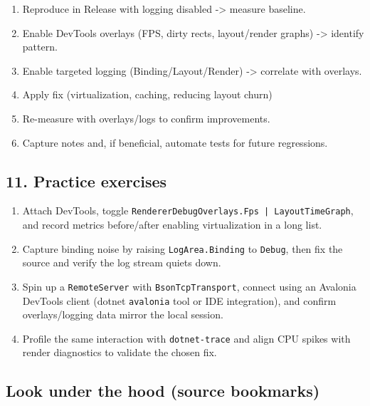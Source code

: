 \begin{enumerate}
\def\labelenumi{\arabic{enumi}.}
\tightlist
\item
  Reproduce in Release with logging disabled -\textgreater{} measure
  baseline.
\item
  Enable DevTools overlays (FPS, dirty rects, layout/render graphs)
  -\textgreater{} identify pattern.
\item
  Enable targeted logging (Binding/Layout/Render) -\textgreater{}
  correlate with overlays.
\item
  Apply fix (virtualization, caching, reducing layout churn)
\item
  Re-measure with overlays/logs to confirm improvements.
\item
  Capture notes and, if beneficial, automate tests for future
  regressions.
\end{enumerate}

\subsection{11. Practice exercises}\label{practice-exercises-18}

\begin{enumerate}
\def\labelenumi{\arabic{enumi}.}
\tightlist
\item
  Attach DevTools, toggle
  \passthrough{\lstinline!RendererDebugOverlays.Fps | LayoutTimeGraph!},
  and record metrics before/after enabling virtualization in a long
  list.
\item
  Capture binding noise by raising
  \passthrough{\lstinline!LogArea.Binding!} to
  \passthrough{\lstinline!Debug!}, then fix the source and verify the
  log stream quiets down.
\item
  Spin up a \passthrough{\lstinline!RemoteServer!} with
  \passthrough{\lstinline!BsonTcpTransport!}, connect using an Avalonia
  DevTools client (dotnet \passthrough{\lstinline!avalonia!} tool or IDE
  integration), and confirm overlays/logging data mirror the local
  session.
\item
  Profile the same interaction with
  \passthrough{\lstinline!dotnet-trace!} and align CPU spikes with
  render diagnostics to validate the chosen fix.
\end{enumerate}

\subsection{Look under the hood (source
bookmarks)}\label{look-under-the-hood-source-bookmarks-22}

